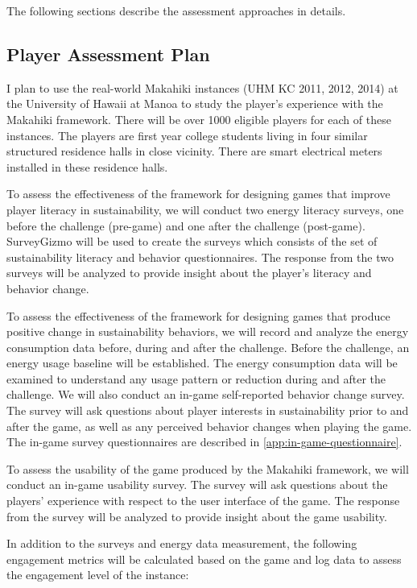 The following sections describe the assessment approaches in details. 

\subsection{Player Assessment Plan}

I plan to use the real-world Makahiki instances (UHM KC 2011, 2012, 2014) at the University of Hawaii at Manoa to study the player's experience with the Makahiki framework. There will be over 1000 eligible players for each of these instances. The players are first year college students living in four similar structured residence halls in close vicinity. There are smart electrical meters installed in these residence halls.

To assess the effectiveness of the framework for designing games that improve player literacy in sustainability, we will 
conduct two energy literacy surveys, one before the challenge (pre-game) and one after
the challenge (post-game). SurveyGizmo will be used to create the surveys which consists of the set of sustainability literacy and behavior questionnaires. The response from the two surveys will be analyzed to provide insight about the player's literacy and behavior change. 

To assess the effectiveness of the framework for designing games that produce positive change in sustainability
behaviors, we will record and analyze the energy consumption data before, during and after the
challenge.  Before the challenge, an energy usage baseline will be established. The energy consumption data will be examined to understand any usage pattern or reduction during and after the challenge.  We will also conduct an in-game self-reported behavior change survey. The survey will ask questions about player interests in sustainability prior to and after the game, as well as any perceived behavior changes when playing the game. The in-game survey questionnaires are described in \autoref{app:in-game-questionnaire}.

To assess the usability of the game produced by the Makahiki framework, we will conduct an in-game usability survey. The survey will ask questions about the players' experience with respect to the user interface of the game. The response from the survey will be analyzed to provide insight about the game usability. 

In addition to the surveys and energy data measurement, the following engagement metrics will be calculated based on the game and log data to assess the engagement level of the instance:

